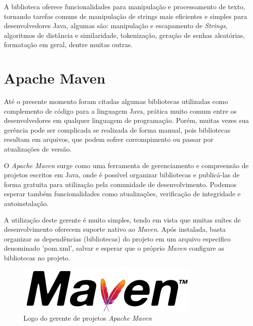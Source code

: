 \documentclass[
	12pt,			%
	openright,		%
	oneside,	
	a4paper,		%
	english,		%
	brazil			%
]{abntex2/abntex2}  %
\begin{document}
			A biblioteca oferece funcionalidades para manipulação e processamento de texto, tornando tarefas comuns de manipulação de strings mais eficientes e simples para desenvolvedores Java, algumas são: manipulação e escapamento de \textit{Strings}, algoritmos de distância e similaridade, tokenização, geração de senhas aleatórias, formatação em geral, dentre muitas outras.
		
		\section{Apache Maven} \label{maven}
		
			Até o presente momento foram citadas algumas bibliotecas utilizadas como complemento de código para a linguagem Java, prática muito comum entre os desenvolvedores em qualquer linguagem de programação. Porém, muitas vezes sua gerência pode ser complicada se realizada de forma manual, pois bibliotecas resultam em arquivos, que podem sofrer corrompimento ou passar por atualizações de versão.
		
			O \textit{Apache Maven} \cite{maven} surge como uma ferramenta de gerenciamento e compreensão de projetos escritos em Java, onde é possível organizar bibliotecas e publicá-las de forma gratuita para utilização pela comunidade de desenvolvimento. Podemos esperar também funcionalidades como atualizações, verificação de integridade e autoinstalação.
		
			A utilização deste gerente é muito simples, tendo em vista que muitas suítes de desenvolvimento oferecem suporte nativo ao \textit{Maven}. Após instalada, basta organizar as dependências (bibliotecas) do projeto em um arquivo especifico denominado 'pom.xml', salvar e esperar que o próprio \textit{Maven} configure as bibliotecas no projeto.
			
			\begin{figure}[ht]
				\begin{center}
					
					\caption{Logo do gerente de projetos \textit{Apache Maven}}
					\includegraphics[scale=0.45]{img/maven-logo}
					
				\end{center}
			\end{figure}
		
\end{document}
